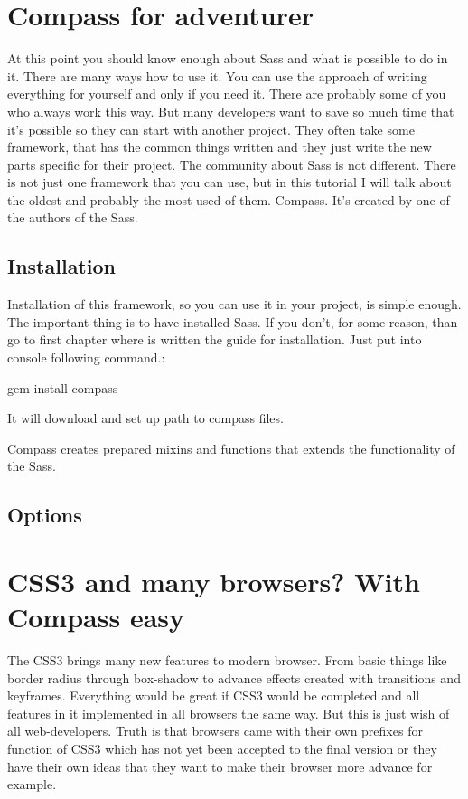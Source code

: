 \documentclass[a4paper,12pt,oneside]{sphinxmanual}
\begin{document}
\chapter{Compass for adventurer}
\label{src/compass_begin::doc}\label{src/compass_begin:compass-for-adventurer}
At this point you should know enough about Sass and what is possible to do in it. There are many ways how to use it. You can use the approach of writing everything for yourself and only if you need it. There are probably some of you who always work this way. But many developers want to save so much time that it's possible so they can start with another project. They often take some framework, that has the common things written and they just write the new parts specific for their project. The community about Sass is not different. There is not just one framework that you can use, but in this tutorial I will talk about the oldest and probably the most used of them. Compass. It's created by one of the authors of the Sass.


\section{Installation}
\label{src/compass_begin:installation}
Installation of this framework, so you can use it in your project, is simple enough. The important thing is to have installed Sass. If you don't, for some reason, than go to first chapter where is written the guide for installation. Just put into console following command.:

gem install compass

It will download and set up path to compass files.

Compass creates prepared mixins and functions that extends the functionality of the Sass.


\section{Options}
\label{src/compass_begin:options}

\chapter{CSS3 and many browsers? With Compass easy}
\label{src/compass_css3:css3-and-many-browsers-with-compass-easy}\label{src/compass_css3::doc}
The CSS3 brings many new features to modern browser. From basic things like border radius through box-shadow to advance effects created with transitions and keyframes. Everything would be great if CSS3 would be completed and all features in it implemented in all browsers the same way. But this is just wish of all web-developers. Truth is that browsers came with their own prefixes for function of CSS3 which has not yet been accepted to the final version or they have their own ideas that they want to make their browser more advance for example.
\end{document}

